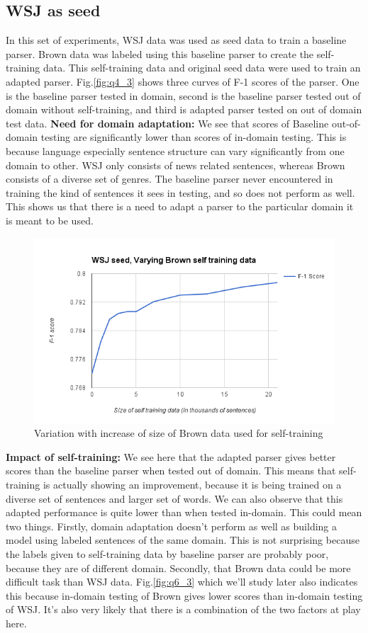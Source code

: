 \documentclass{article}
\begin{document}
\subsection{WSJ as seed}
In this set of experiments, WSJ data was used as seed data to train a baseline parser. Brown data was labeled using this baseline parser to create the self-training data. This self-training data and original seed data were used to train an adapted parser. Fig.\ref{fig:q4_3} shows three curves of F-1 scores of the parser. One is the baseline parser tested in domain, second is the baseline parser tested out of domain without self-training, and third is adapted parser tested on out of domain test data. 
\clearpage
\textbf{Need for domain adaptation:} We see that scores of Baseline out-of-domain testing are significantly lower than scores of in-domain testing. This is because language especially sentence structure can vary significantly from one domain to other. WSJ only consists of news related sentences, whereas Brown consists of a diverse set of genres. The baseline parser never encountered in training the kind of sentences it sees in testing, and so does not perform as well. This shows us that there is a need to adapt a parser to the particular domain it is meant to be used. 

\begin{figure}[h]
   \centering
    \includegraphics[width=0.75\linewidth]{plots/q5.png}
    \caption{Variation with increase of size of Brown data used for self-training}
   \label{fig:q5}
\end{figure}

\textbf{Impact of self-training:} We see here that the adapted parser gives better scores than the baseline parser when tested out of domain. This means that self-training is actually showing an improvement, because it is being trained on a diverse set of sentences and larger set of words. We can also observe that this adapted performance is quite lower than when tested in-domain. This could mean two things. Firstly, domain adaptation doesn't perform as well as building a model using labeled sentences of the same domain. This is not surprising because the labels given to self-training data by baseline parser are probably poor, because they are of different domain.  Secondly, that Brown data could be more difficult task than WSJ data. Fig.\ref{fig:q6_3} which we'll study later also indicates this because in-domain testing of Brown gives lower scores than in-domain testing of WSJ. It's also very likely that there is a combination of the two factors at play here. 
\end{document}
